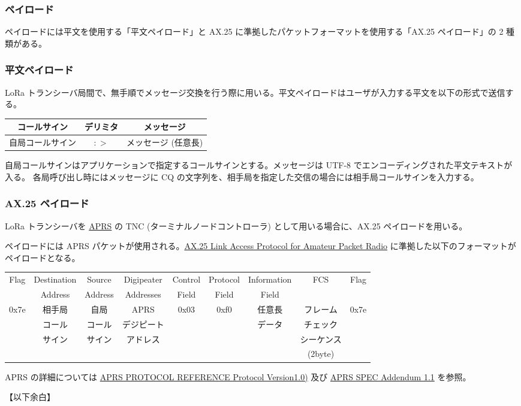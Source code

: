 \documentclass[a4j,oneside]{ujbook}
\begin{document}
\subsubsection*{ペイロード}

ペイロードには平文を使用する「平文ペイロード」と AX.25 に準拠したパケットフォーマットを使用する「AX.25 ペイロード」の 2 種類がある。

\subsubsection*{平文ペイロード}

LoRa トランシーバ局間で、無手順でメッセージ交換を行う際に用いる。平文ペイロードはユーザが入力する平文を以下の形式で送信する。

\begin{center}
 \begin{tabular}{|c|c|c|}
  \hline
  {コールサイン} & {デリミタ} & {メッセージ} \\
  \hline
  {自局コールサイン} & {$:>$} & {メッセージ (任意長)} \\
  \hline
 \end{tabular}
\end{center}

自局コールサインはアプリケーションで指定するコールサインとする。メッセージは UTF-8 でエンコーディングされた平文テキストが入る。
各局呼び出し時にはメッセージに CQ の文字列を、相手局を指定した交信の場合には相手局コールサインを入力する。

\subsubsection*{AX.25 ペイロード}
LoRa トランシーバを \href{http://www.aprs.org/doc/APRS101.PDF}{APRS} の TNC (ターミナルノードコントローラ) として用いる場合に、AX.25 ペイロードを用いる。

ペイロードには APRS パケットが使用される。\href{https://www.tapr.org/pdf/AX25.2.2.pdf}{AX.25 Link Access Protocol for Amateur Packet Radio} に準拠した以下のフォーマットがペイロードとなる。

\begin{center}
 \begin{tabular}{|c|c|c|c|c|c|c|c|c|}
  \hline
  {Flag} & {Destination} & {Source} & {Digipeater} & {Control} & {Protocol} & {Information} & {FCS} & {Flag} \\
  {} & {Address} & {Address} & {Addresses} & {Field} & {Field} & {Field} & {} & {} \\
  \hline
  {0x7e} & {相手局} & {自局} & {APRS} & {0x03} & {0xf0} & {任意長} & {フレーム} & {0x7e} \\
  {} & {コール} & {コール} & {デジピート} & {} & {} & {データ} & {チェック} & {} \\
  {} & {サイン} & {サイン} & {アドレス} & {} & {} & {} & {シーケンス} & {} \\
  {} & {} & {} & {} & {} & {} & {} & {(2byte)} & {} \\
  \hline
 \end{tabular}
\end{center}

APRS の詳細については \href{http://www.aprs.org/doc/APRS101.PDF}{APRS PROTOCOL REFERENCE Protocol Version1.0)} 及び \href{http://www.aprs.org/aprs11.html}{APRS SPEC Addendum 1.1} を参照。

\vspace{1cm}
【以下余白】
\end{document}
